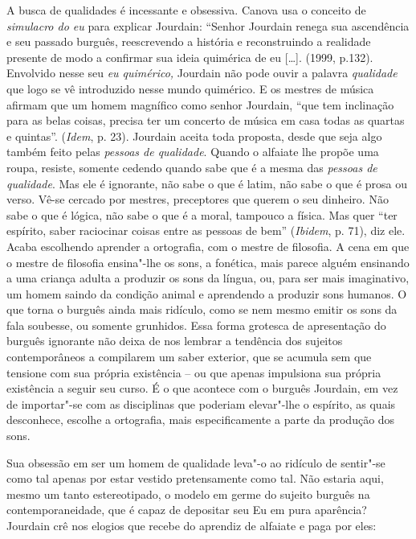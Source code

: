 A busca de qualidades é incessante e obsessiva. Canova usa o conceito de
\emph{simulacro do eu} para explicar Jourdain: ``Senhor Jourdain renega
sua ascendência e seu passado burguês, reescrevendo a história e
reconstruindo a realidade presente de modo a confirmar sua ideia
quimérica de eu [\ldots{}]. (1999, p.132). Envolvido nesse seu
\emph{eu quimérico,} Jourdain não pode ouvir a palavra \emph{qualidade}
que logo se vê introduzido nesse mundo quimérico. E os mestres de música
afirmam que um homem magnífico como senhor Jourdain, ``que tem
inclinação para as belas coisas, precisa ter um concerto de música em
casa todas as quartas e quintas''. (\emph{Idem}, p. 23). Jourdain aceita
toda proposta, desde que seja algo também feito pelas \emph{pessoas de
qualidade}. Quando o alfaiate lhe propõe uma roupa, resiste, somente
cedendo quando sabe que é a mesma das \emph{pessoas de qualidade}. Mas
ele é ignorante, não sabe o que é latim, não sabe o que é prosa ou
verso. Vê-se cercado por mestres, preceptores que querem o seu dinheiro.
Não sabe o que é lógica, não sabe o que é a moral, tampouco a física.
Mas quer ``ter espírito, saber raciocinar coisas entre as pessoas de
bem'' (\emph{Ibidem}, p. 71), diz ele. Acaba escolhendo aprender a
ortografia, com o mestre de filosofia. A cena em que o mestre de
filosofia ensina"-lhe os sons, a fonética, mais parece alguém ensinando a
uma criança adulta a produzir os sons da língua, ou, para ser mais
imaginativo, um homem saindo da condição animal e aprendendo a produzir
sons humanos. O que torna o burguês ainda mais ridículo, como se nem
mesmo emitir os sons da fala soubesse, ou somente grunhidos. Essa forma
grotesca de apresentação do burguês ignorante não deixa de nos lembrar a
tendência dos sujeitos contemporâneos a compilarem um saber exterior,
que se acumula sem que tensione com sua própria existência -- ou que
apenas impulsiona sua própria existência a seguir seu curso. É o que
acontece com o burguês Jourdain, em vez de importar"-se com as
disciplinas que poderiam elevar"-lhe o espírito, as quais desconhece,
escolhe a ortografia, mais especificamente a parte da produção dos sons.

Sua obsessão em ser um homem de qualidade leva"-o ao ridículo de
sentir"-se como tal apenas por estar vestido pretensamente como tal. Não
estaria aqui, mesmo um tanto estereotipado, o modelo em germe do sujeito
burguês na contemporaneidade, que é capaz de depositar seu Eu em pura
aparência? Jourdain crê nos elogios que recebe do aprendiz de alfaiate e
paga por eles:


